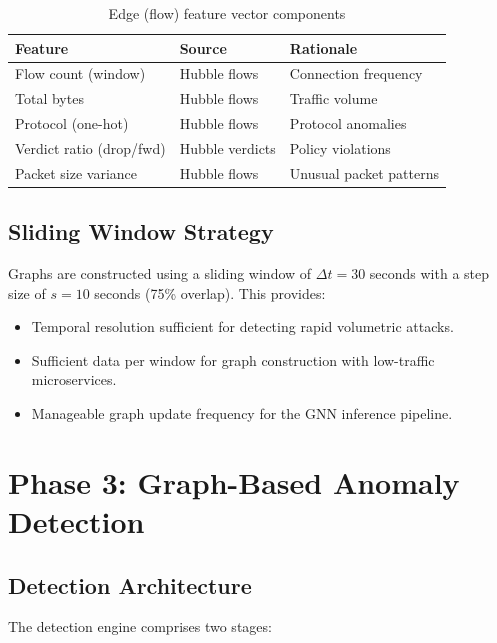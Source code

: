 \begin{table}[H]
\centering
\caption{Edge (flow) feature vector components}
\label{tab:edge_features}
\begin{tabular}{lll}
\toprule
\textbf{Feature} & \textbf{Source} & \textbf{Rationale} \\
\midrule
Flow count (window)         & Hubble flows      & Connection frequency \\
Total bytes                 & Hubble flows      & Traffic volume \\
Protocol (one-hot)          & Hubble flows      & Protocol anomalies \\
Verdict ratio (drop/fwd)    & Hubble verdicts   & Policy violations \\
Packet size variance        & Hubble flows      & Unusual packet patterns \\
\bottomrule
\end{tabular}
\end{table}

\subsection{Sliding Window Strategy}

Graphs are constructed using a sliding window of $\Delta t = 30$ seconds with a step size
of $s = 10$ seconds (75\% overlap). This provides:
\begin{itemize}
  \item Temporal resolution sufficient for detecting rapid volumetric attacks.
  \item Sufficient data per window for graph construction with low-traffic microservices.
  \item Manageable graph update frequency for the GNN inference pipeline.
\end{itemize}

\section{Phase 3: Graph-Based Anomaly Detection}
\label{sec:design_phase3}

\subsection{Detection Architecture}

The detection engine comprises two stages:

